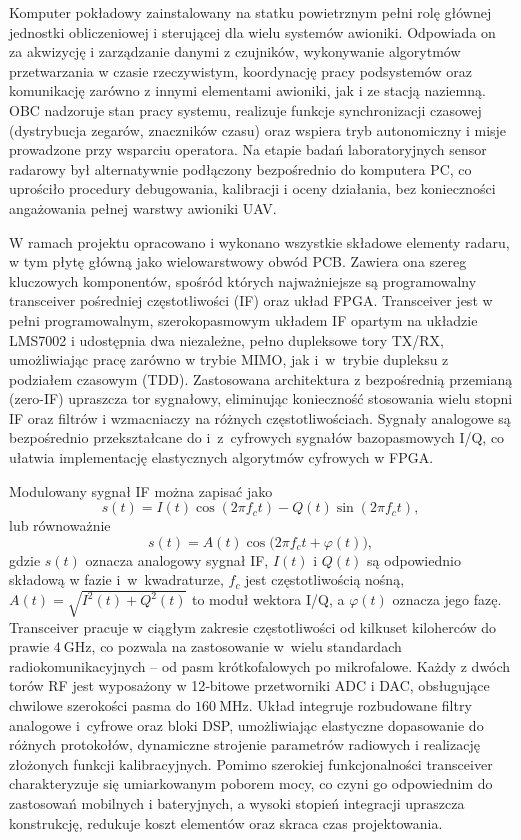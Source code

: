 Komputer pokładowy zainstalowany na statku powietrznym pełni rolę głównej jednostki obliczeniowej i sterującej dla wielu systemów awioniki. 
Odpowiada on za akwizycję i zarządzanie danymi z czujników, wykonywanie algorytmów przetwarzania w czasie rzeczywistym, koordynację pracy podsystemów oraz komunikację zarówno z innymi elementami awioniki, jak i ze stacją naziemną. 
OBC nadzoruje stan pracy systemu, realizuje funkcje synchronizacji czasowej (dystrybucja zegarów, znaczników czasu) oraz wspiera tryb autonomiczny i misje prowadzone przy wsparciu operatora. 
Na etapie badań laboratoryjnych sensor radarowy był alternatywnie podłączony bezpośrednio do komputera PC, co uprościło procedury debugowania, kalibracji i oceny działania, bez konieczności angażowania pełnej warstwy awioniki UAV.

W ramach projektu opracowano i wykonano wszystkie składowe elementy radaru, w tym płytę główną jako wielowarstwowy obwód PCB. 
Zawiera ona szereg kluczowych komponentów, spośród których najważniejsze są programowalny transceiver pośredniej częstotliwości (IF) oraz układ FPGA. 
Transceiver jest w pełni programowalnym, szerokopasmowym układem IF opartym na układzie LMS7002 i
udostępnia dwa niezależne, pełno dupleksowe tory TX/RX, umożliwiając pracę zarówno w trybie MIMO, jak i~w~trybie dupleksu z podziałem czasowym (TDD). 
Zastosowana architektura z bezpośrednią przemianą (zero-IF) upraszcza tor sygnałowy, eliminując konieczność stosowania wielu stopni IF oraz filtrów i wzmacniaczy na różnych częstotliwościach. 
Sygnały analogowe są bezpośrednio przekształcane do i~z~cyfrowych sygnałów bazopasmowych I/Q, co ułatwia implementację elastycznych algorytmów cyfrowych w FPGA.

Modulowany sygnał IF można zapisać jako
\begin{equation}
s(t) = I(t)\cos(2\pi f_c t) - Q(t)\sin(2\pi f_c t),
\end{equation}
lub równoważnie
\begin{equation}
s(t) = A(t)\cos\bigl(2\pi f_c t + \varphi(t)\bigr),
\end{equation}
gdzie \(s(t)\) oznacza analogowy sygnał IF, \(I(t)\) i \(Q(t)\) są odpowiednio składową w fazie i~w~kwadraturze, \(f_c\) jest częstotliwością nośną, 
\(A(t) = \sqrt{I^2(t)+Q^2(t)}\) to moduł wektora I/Q, a \(\varphi(t)\) oznacza jego fazę. 
Transceiver pracuje w ciągłym zakresie częstotliwości od kilkuset kiloherców do prawie \(4~\mathrm{GHz}\), co pozwala na zastosowanie w~wielu standardach radiokomunikacyjnych -- od pasm krótkofalowych po mikrofalowe. 
Każdy z dwóch torów RF jest wyposażony w 12‑bitowe przetworniki ADC i DAC, obsługujące chwilowe szerokości pasma do \(160~\mathrm{MHz}\). 
Układ integruje rozbudowane filtry analogowe i~cyfrowe oraz bloki DSP, umożliwiając elastyczne dopasowanie do różnych protokołów, dynamiczne strojenie parametrów radiowych i realizację złożonych funkcji kalibracyjnych. 
Pomimo szerokiej funkcjonalności transceiver charakteryzuje się umiarkowanym poborem mocy, co czyni go odpowiednim do zastosowań mobilnych i bateryjnych, a wysoki stopień integracji upraszcza konstrukcję, redukuje koszt elementów oraz skraca czas projektowania.

